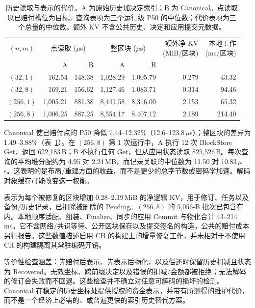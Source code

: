\begin{table}[t]
  \caption{历史读取与表示的代价。A 为原始历史加决定索引；B 为 Canonical。点读取以已赔付槽位为目标。查询表项为三个运行级 P50 的中位数；代价表项为三个总量的中位数。额外 KV 不含公共历史、决定和应用提交元数据。}
  \label{tab:eval-reader}
  \centering
  \small
  \setlength{\tabcolsep}{8pt}
  \begin{tabular}{@{}crrrrrr@{}}
    \toprule
    $(n,m)$ &
    \multicolumn{2}{c}{点读取 ($\mu$s)} &
    \multicolumn{2}{c}{整区块 ($\mu$s)} &
    \shortstack{额外净 KV\\(MiB/区块)} &
    \shortstack{本地工作\\(ms/区块)} \\
    \cmidrule(lr){2-3}\cmidrule(lr){4-5}
    & A & B & A & B & & \\
    \midrule
    $(32,1)$  & 162.54  & 148.38 & 1,028.29 & 1,005.79 & 0.279 & 43.32 \\
    $(32,8)$  & 169.21  & 156.62 & 1,127.46 & 1,083.71 & 0.314 & 94.46 \\
    $(256,1)$ & 1,005.21 & 881.38 & 8,441.58 & 8,316.00 & 2.153 & 65.32 \\
    $(256,8)$ & 1,006.25 & 887.25 & 8,554.17 & 8,407.12 & 2.189 & 214.40 \\
    \bottomrule
  \end{tabular}
\end{table}

Canonical 使已赔付点的 P50 降低 7.44--12.32\%（12.6--123.8\,$\mu$s）；整区块的差异为 1.49--3.88\%（表~\ref{tab:eval-reader}）。在 $(256,8)$ 第 1 次运行中，A 执行 12 次 BlockStore Get，返回 622,183\,B；B 不执行任何 Get，但从应用状态读取 825,526\,B。每次查询的平均堆分配约为 4.95 对 2.24\,MB，而记录关联的中位数为 11.50 对 10.83\,$\mu$s。这表明的是布局/重建方面的收益，而不是更少的总字节数或密码学加速。解码对象缓存可能改变这一权衡。

表示为每个被修复的区块增加 0.28--2.19\,MiB 的净逻辑 KV，用于修订、任务以及备份/历史记录，已扣除被删除的 Pending。$(256,8)$ 的 5,056-B 批次已包含在内。本地顺序适配、组装、Finalize、同步的应用 Commit 与物化合计 43--214\,ms。它不含网络/共识等待、公开区块保存以及提交签名的构造。公共的赔付成本另行报告。这些数值描述启用 CH 的构建上的增量修复工作，并未相对于不使用 CH 的构建隔离其常驻编码开销。

等价性检查涵盖：先赔付后表示、先表示后物化，以及偿还时保留历史扣减且状态为 Recovered。无效坐标、跨前缀决定以及错误的扣减/金额都被拒绝；无法解码的修订会失败而不回退。这些检查并不确立对任意可解码的损坏的检测。Canonical 在稳定的历史坐标处提供授权的资金表示，并带有所测得的维护代价，而不是一个经济上必需的、或普遍更快的索引历史替代方案。

